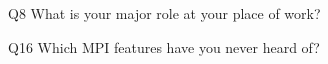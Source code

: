\begin{description}%
\item{Q8} What is your major role at your place of work?%
\item{Q16} Which MPI features have you never heard of?%
\end{description}%
